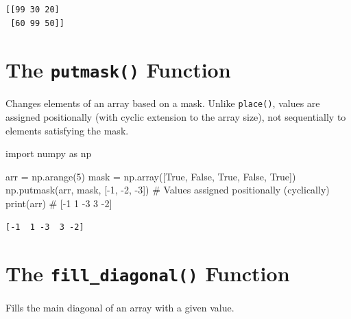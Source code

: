 \documentclass[
  english,
  letterpaper,
  DIV=11,
  numbers=noendperiod]{scrreprt}
\newenvironment{Shaded}{\begin{snugshade}}{\end{snugshade}}
\newcommand{\BuiltInTok}[1]{\textcolor[rgb]{0.00,0.23,0.31}{#1}}
\newcommand{\CommentTok}[1]{\textcolor[rgb]{0.37,0.37,0.37}{#1}}
\newcommand{\DecValTok}[1]{\textcolor[rgb]{0.68,0.00,0.00}{#1}}
\newcommand{\ImportTok}[1]{\textcolor[rgb]{0.00,0.46,0.62}{#1}}
\newcommand{\NormalTok}[1]{\textcolor[rgb]{0.00,0.23,0.31}{#1}}
\newcommand{\OperatorTok}[1]{\textcolor[rgb]{0.37,0.37,0.37}{#1}}
\newcommand{\VariableTok}[1]{\textcolor[rgb]{0.07,0.07,0.07}{#1}}
\begin{document}
\begin{verbatim}
[[99 30 20]
 [60 99 50]]
\end{verbatim}

\section{\texorpdfstring{The \texttt{putmask()}
Function}{The putmask() Function}}\label{the-putmask-function}

Changes elements of an array based on a mask. Unlike \texttt{place()},
values are assigned positionally (with cyclic extension to the array
size), not sequentially to elements satisfying the mask.

\begin{Shaded}
\begin{Highlighting}[]
\ImportTok{import}\NormalTok{ numpy }\ImportTok{as}\NormalTok{ np}

\NormalTok{arr }\OperatorTok{=}\NormalTok{ np.arange(}\DecValTok{5}\NormalTok{)}
\NormalTok{mask }\OperatorTok{=}\NormalTok{ np.array([}\VariableTok{True}\NormalTok{, }\VariableTok{False}\NormalTok{, }\VariableTok{True}\NormalTok{, }\VariableTok{False}\NormalTok{, }\VariableTok{True}\NormalTok{])}
\NormalTok{np.putmask(arr, mask, [}\OperatorTok{{-}}\DecValTok{1}\NormalTok{, }\OperatorTok{{-}}\DecValTok{2}\NormalTok{, }\OperatorTok{{-}}\DecValTok{3}\NormalTok{])  }\CommentTok{\# Values assigned positionally (cyclically)}
\BuiltInTok{print}\NormalTok{(arr)  }\CommentTok{\# [{-}1  1 {-}3  3 {-}2]}
\end{Highlighting}
\end{Shaded}

\begin{verbatim}
[-1  1 -3  3 -2]
\end{verbatim}

\section{\texorpdfstring{The \texttt{fill\_diagonal()}
Function}{The fill\_diagonal() Function}}\label{the-fill_diagonal-function}

Fills the main diagonal of an array with a given value.
\end{document}
